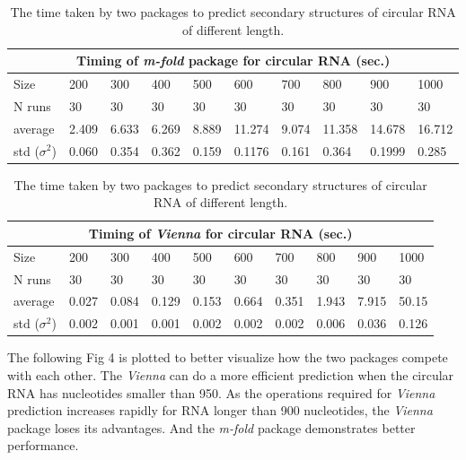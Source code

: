 \documentclass[12pt]{article}
\begin{document}
\begin{table}[h!]
\begin{center}
\begin{tabular}{ |p{1.5cm}||p{1.2cm}|p{1.2cm}|p{1.2cm}|p{1.2cm}|p{1.2cm}|p{1.2cm}|p{1.2cm}| p{1.2cm} | p{1.2cm} |}
\hline
\multicolumn{10}{|c|}{Timing of \textit{m-fold} package for circular RNA (sec.)} \\
\hline
Size& 200& 300& 400& 500& 600& 700 & 800 & 900 & 1000\\
\hline
N runs& 30 & 30& 30 & 30& 30& 30& 30& 30& 30\\
\hline
average& 2.409 & 6.633 & 6.269 & 8.889 & 11.274 & 9.074 & 11.358 & 14.678 &16.712\\
std ($\sigma^2$) & 0.060 & 0.354 & 0.362 & 0.159 & 0.1176 & 0.161 & 0.364 & 0.1999 & 0.285 \\
\hline
\end{tabular}
\begin{tabular}{ |p{1.5cm}||p{1.2cm}|p{1.2cm}|p{1.2cm}|p{1.2cm}|p{1.2cm}|p{1.2cm}|p{1.2cm}| p{1.2cm} | p{1.2cm} |}
\hline
\multicolumn{10}{|c|}{Timing of \textit{Vienna} for circular RNA (sec.)} \\
\hline
Size& 200& 300& 400& 500& 600& 700 & 800 & 900 & 1000\\
\hline
N runs& 30 & 30& 30 & 30& 30& 30& 30& 30& 30\\
\hline
average& 0.027 & 0.084 & 0.129 & 0.153 & 0.664 & 0.351 & 1.943 & 7.915 & 50.15\\
std ($\sigma^2$) & 0.002 & 0.001 & 0.001 & 0.002 & 0.002 & 0.002 & 0.006 & 0.036 & 0.126 \\
\hline
\end{tabular}
\end{center}
\caption{The time taken by two packages to predict secondary structures of circular RNA of different length.}
\end{table}

The following Fig 4 is plotted to better visualize how the two packages compete with each other. The \textit{Vienna} can do a more efficient prediction when the circular RNA has nucleotides smaller than 950. As the operations required for \textit{Vienna} prediction increases rapidly for RNA longer than 900 nucleotides, the \textit{Vienna} package loses its advantages. And the \textit{m-fold} package demonstrates better performance.
\end{document}
